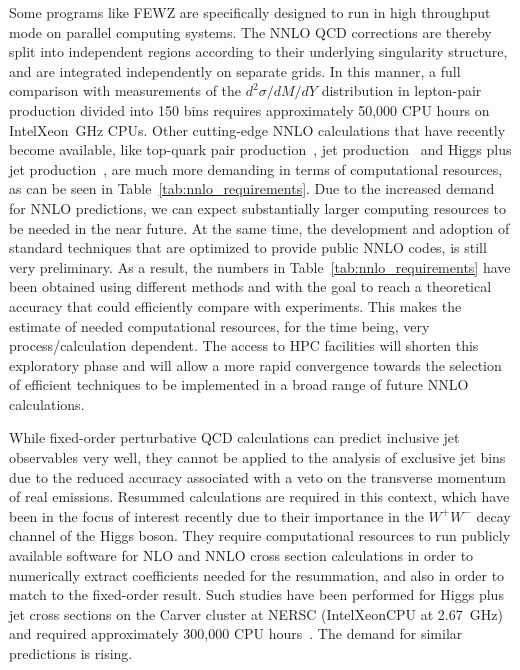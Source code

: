 Some programs like FEWZ are specifically designed to run in high
throughput mode on parallel computing systems. The NNLO QCD
corrections are thereby split into independent regions according to
their underlying singularity structure, and are integrated
independently on separate grids.  In this manner, a full comparison
with measurements of the $d^2 \sigma/dM/dY$ distribution in
lepton-pair production divided into 150 bins requires approximately
50,000 CPU hours on Intel\registered Xeon~GHz CPUs.
Other cutting-edge NNLO calculations that have recently become
available, like top-quark pair
production~\cite{Baernreuther:2012ws,Czakon:2013goa},
jet production~\cite{Ridder:2013mf} and Higgs plus
jet production~\cite{Boughezal:2013uia}, are much more demanding in
terms of computational resources, as can be seen in
Table~\ref{tab:nnlo_requirements}. Due to the increased demand for
NNLO predictions, we can expect substantially larger computing
resources to be needed in the near future. At the same time, the
development and adoption of standard techniques that
are optimized to provide public NNLO codes, is still very
preliminary. As a result, the numbers in
Table~\ref{tab:nnlo_requirements} have been obtained using different
methods and with the goal to reach a theoretical accuracy that
could efficiently compare with experiments. This makes the estimate
of needed computational resources, for the time being, very
process/calculation dependent. The access to HPC facilities will
shorten this exploratory phase and will allow a more rapid
convergence towards the selection of efficient techniques 
to be implemented in a broad range of future NNLO calculations.

While fixed-order perturbative QCD calculations can predict inclusive
jet observables very well, they cannot be applied to the analysis of 
exclusive jet bins due to the reduced accuracy associated with
a veto on the transverse momentum of real emissions.
Resummed calculations are required in this context, which have been
in the focus of interest recently due to their importance in the
$W^+W^-$ decay channel of the Higgs boson. They require computational
resources to run publicly available software for NLO and NNLO cross
section calculations in order to numerically extract coefficients needed
for the resummation, and also in order to match to the fixed-order result. 
Such studies have been performed for Higgs plus jet cross sections
on the Carver cluster at NERSC (Intel\registered Xeon\registered CPU at 2.67~GHz) 
and required approximately 300,000 CPU hours~\cite{Stewart:2013faa}. 
The demand for similar predictions is rising.

